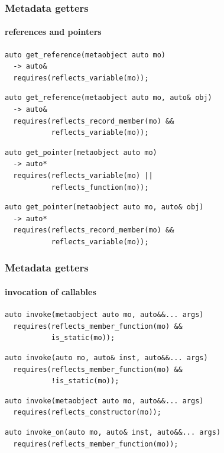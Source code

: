 \documentclass[compress,table,xcolor=table]{beamer}
\begin{document}
\begin{frame}[fragile]
  \frametitle{Metadata getters}
  \framesubtitle{references and pointers}
  \begin{lstlisting}[language=c++2x,basicstyle=\footnotesize\ttfamily]
auto get_reference(metaobject auto mo)
  -> auto&
  requires(reflects_variable(mo));
  \end{lstlisting}
  \vfill
  \begin{lstlisting}[language=c++2x,basicstyle=\footnotesize\ttfamily]
auto get_reference(metaobject auto mo, auto& obj)
  -> auto&
  requires(reflects_record_member(mo) &&
           reflects_variable(mo));
  \end{lstlisting}
  \vfill
  \begin{lstlisting}[language=c++2x,basicstyle=\footnotesize\ttfamily]
auto get_pointer(metaobject auto mo)
  -> auto*
  requires(reflects_variable(mo) ||
           reflects_function(mo));
  \end{lstlisting}
  \vfill
  \begin{lstlisting}[language=c++2x,basicstyle=\footnotesize\ttfamily]
auto get_pointer(metaobject auto mo, auto& obj)
  -> auto*
  requires(reflects_record_member(mo) &&
           reflects_variable(mo));
  \end{lstlisting}
\end{frame}
\begin{frame}[fragile]
  \frametitle{Metadata getters}
  \framesubtitle{invocation of callables}
  \begin{lstlisting}[language=c++2x,basicstyle=\footnotesize\ttfamily]
auto invoke(metaobject auto mo, auto&&... args)
  requires(reflects_member_function(mo) &&
           is_static(mo));
  \end{lstlisting}
  \vfill
  \begin{lstlisting}[language=c++2x,basicstyle=\footnotesize\ttfamily]
auto invoke(auto mo, auto& inst, auto&&... args)
  requires(reflects_member_function(mo) &&
           !is_static(mo));
  \end{lstlisting}
  \vfill
  \begin{lstlisting}[language=c++2x,basicstyle=\footnotesize\ttfamily]
auto invoke(metaobject auto mo, auto&&... args)
  requires(reflects_constructor(mo));
  \end{lstlisting}
  \vfill
  \begin{lstlisting}[language=c++2x,basicstyle=\footnotesize\ttfamily]
auto invoke_on(auto mo, auto& inst, auto&&... args)
  requires(reflects_member_function(mo));
  \end{lstlisting}
\end{frame}
\end{document}
